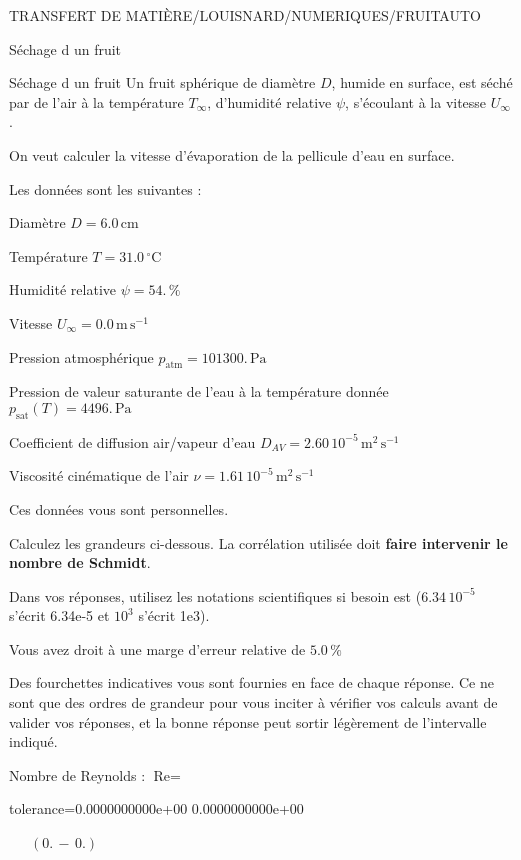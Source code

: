 \documentclass[12pt]{article}
\begin{document}
\begin{quiz}{TRANSFERT DE MATIÈRE/LOUISNARD/NUMERIQUES/FRUITAUTO}
\begin{cloze}{Séchage d un fruit}
\end{cloze} 


 \begin{cloze}{Séchage d un fruit} 
Un fruit sphérique de diamètre $D$, humide en surface, est séché par de l'air à la température $T_\infty$, d'humidité relative $\psi$, s'écoulant à la vitesse $U_\infty$.

On veut calculer la vitesse d'évaporation de la pellicule d'eau en surface.

 

Les données sont les suivantes :

 

Diamètre $D = 6.0\,  \mathrm{cm} $

Température $T = 31.0\,  \mathrm{^\circ\mathrm{C}} $

Humidité relative $\psi = 54.\, \% $

Vitesse $U_\infty = 0.0\,  \mathrm{m}\,  \mathrm{s}^{-1} $

Pression atmosphérique $p_{\text{atm}} = 101300.\,  \mathrm{Pa} $

Pression de valeur saturante de l’eau à la température donnée $p_{\text{sat}}(T) = 4496.\,  \mathrm{Pa} $

Coefficient de diffusion air/vapeur d’eau $D_{AV} =  2.60 \, 10^{-5} \,  \mathrm{m}^{2}\,  \mathrm{s}^{-1} $

Viscosité cinématique de l’air $\nu =  1.61 \, 10^{-5} \,  \mathrm{m}^{2}\,  \mathrm{s}^{-1} $

Ces données vous sont personnelles.

 

Calculez les grandeurs ci-dessous. La corrélation utilisée doit \textbf{faire intervenir le nombre de Schmidt}.

Dans vos réponses, utilisez les notations scientifiques si besoin est ($6.34\, 10^{-5}$ s'écrit 6.34e-5 et $10^{3}$ s'écrit 1e3).

Vous avez droit à une marge d'erreur relative de $5.0\, \% $

Des fourchettes indicatives vous sont fournies en face de chaque réponse. Ce ne sont que des ordres de grandeur pour vous inciter à vérifier vos calculs avant de valider vos réponses, et la bonne réponse peut sortir légèrement de l'intervalle indiqué.

 

Nombre de Reynolds : $\text{Re} =  $
\begin{numerical}[points=1] 
\item[tolerance={0.0000000000e+00}] 0.0000000000e+00 
\end{numerical} 
 $\,$ 
 $ \quad (0. \, - \, 0.) $ 


\end{cloze}
\end{quiz}
\end{document}
